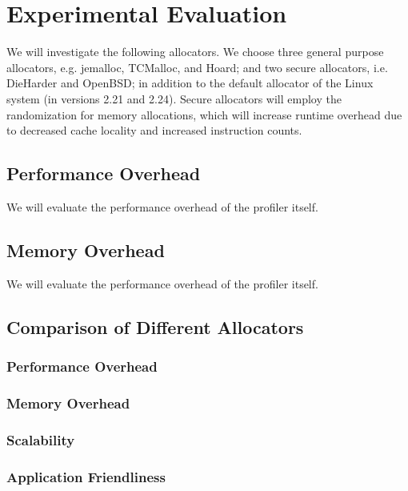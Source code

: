 \section{Experimental Evaluation}
\label{sec:evaluation}

We will investigate the following allocators. We choose three general purpose allocators, e.g. jemalloc, TCMalloc, and Hoard; and two secure allocators, i.e. DieHarder and OpenBSD; in addition to the default allocator of the Linux system (in versions 2.21 and 2.24). Secure allocators will employ the randomization for memory allocations, which will increase runtime overhead due to decreased cache locality and increased instruction counts.

\subsection{Performance Overhead}
We will evaluate the performance overhead of the profiler itself. 

\subsection{Memory Overhead}
We will evaluate the performance overhead of the profiler itself. 

\subsection{Comparison of Different Allocators}

\subsubsection{Performance Overhead}



\subsubsection{Memory Overhead}

\subsubsection{Scalability}



\subsubsection{Application Friendliness}

